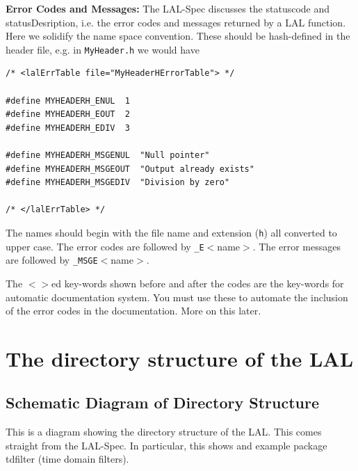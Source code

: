 \documentclass[oneside]{book}
\begin{document}
\bigskip

{\noindent \bf Error Codes and Messages:} The LAL-Spec discusses the
statuscode and statusDesription, i.e. the error codes and  messages
returned by a LAL function. Here we solidify the name space
convention. These should be hash-defined in the header file, e.g. in
{\tt MyHeader.h} we would have
\begin{verbatim}
/* <lalErrTable file="MyHeaderHErrorTable"> */

#define MYHEADERH_ENUL  1 
#define MYHEADERH_EOUT  2
#define MYHEADERH_EDIV  3

#define MYHEADERH_MSGENUL  "Null pointer"
#define MYHEADERH_MSGEOUT  "Output already exists"
#define MYHEADERH_MSGEDIV  "Division by zero"

/* </lalErrTable> */
\end{verbatim}
\noindent The names should begin with the file name and extension ({\tt h})
all converted to upper case. The error codes are followed by
{\tt \_E}$<$name$>$. The error messages are followed by
{\tt \_MSGE}$<$name$>$.

The $<>$ed key-words shown before and after the codes are the
key-words for automatic documentation system.  You must use these to
automate the inclusion of the error codes in the documentation.  More
on this later.

\chapter{The directory structure of the LAL}
\label{c:DirectoryStructure}

\newpage
\section{Schematic Diagram of Directory Structure}
This is a diagram showing the   directory structure of the LAL.
This comes straight from the LAL-Spec. In particular, this shows
and example package tdfilter  (time domain filters).
\end{document}
